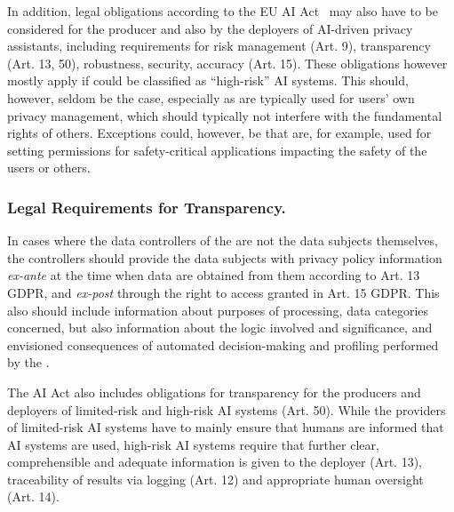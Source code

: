 In addition, legal obligations according to the EU AI Act~\cite{eu_ai_act_2024} may also have to be considered for the producer and also by the deployers of AI-driven privacy assistants, including requirements for risk management (Art. 9), transparency (Art. 13, 50), robustness, security, accuracy (Art. 15). These obligations however mostly apply if \PPAs could be classified as ``high-risk'' AI systems. This should, however, seldom be the case, especially as \PPAs are typically used for users' own privacy management, which should typically not interfere with the fundamental rights of others.
Exceptions could, however, be \PPAs that are, for example, used for setting permissions for safety-critical applications impacting the safety of the users or others.



\subsubsection{Legal Requirements for Transparency.}
In cases where the data controllers of the \PPAs are not the data subjects themselves, the controllers should provide the data subjects with privacy policy information \textit{ex-ante} at the time when data are obtained from them according to Art. 13 GDPR, and \textit{ex-post} through the right to access granted in Art. 15 GDPR.
This also should include information about purposes of processing, data categories concerned, but also information about the logic involved and significance, and envisioned consequences of automated decision-making and profiling performed by the \PPAs.

The AI Act also includes obligations for transparency for the producers and deployers of limited-risk and high-risk AI systems (Art. 50). While the providers of limited-risk AI systems have to mainly ensure that humans are informed that AI systems are used, high-risk AI systems require that further clear, comprehensible and adequate information is given to the deployer (Art. 13), traceability of results via logging (Art. 12) and appropriate human oversight (Art. 14).

